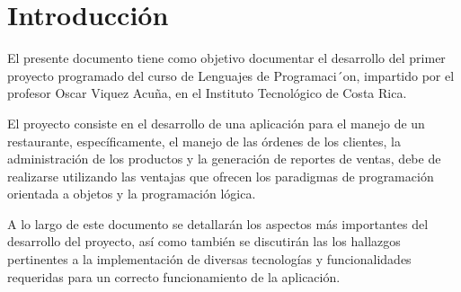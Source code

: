 \section{Introducción}

El presente documento tiene como objetivo documentar el desarrollo del
primer proyecto programado del curso de Lenguajes de Programaci´on,
impartido por el profesor Oscar Viquez Acuña, en el Instituto
Tecnológico de Costa Rica.

El proyecto consiste en el desarrollo de una aplicación para el 
manejo de un restaurante, específicamente, el manejo de las órdenes
de los clientes, la administración de los productos y la
generación de reportes de ventas, debe de realizarse utilizando 
las ventajas que ofrecen los paradigmas de programación orientada 
a objetos y la programación lógica.

A lo largo de este documento se detallarán los aspectos más importantes
del desarrollo del proyecto, así como también se discutirán las 
los hallazgos pertinentes a la implementación de diversas tecnologías 
y funcionalidades requeridas para un correcto funcionamiento de la 
aplicación.
